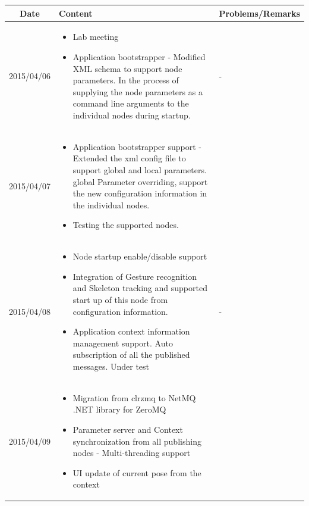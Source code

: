 \documentclass[11pt]{article} %
\begin{document}
\begin{center}
    \begin{longtable}{ | c | p{6cm} | p{5cm} |}
    \hline
    Date & Content & Problems/Remarks \\ 
    \endhead
    \hline    
     2015/04/06         & 
  \begin{itemize}
  \item Lab meeting
  \item Application bootstrapper - Modified XML schema to support node parameters. In the process of supplying the node parameters as a command line arguments to the individual nodes during startup.
\end{itemize}  
   & - \\
\hline
  										 
 2015/04/07         & 
  \begin{itemize}
  \item Application bootstrapper support - Extended the xml config file to support global and local parameters. global Parameter overriding, support the new configuration information in the individual nodes. 
  \item Testing the supported nodes. 
\end{itemize}   
& 
 \\
\hline
  										 
  
  2015/04/08        & 
  \begin{itemize}
  \item Node startup enable/disable support
  \item Integration of Gesture recognition and Skeleton tracking and supported start up of this node from configuration information.
  \item Application context information management support. Auto subscription of all the published messages. Under test
  \end{itemize}   
  										 & - \\
  \hline
  
  2015/04/09         & 
  \begin{itemize}
  \item Migration from clrzmq to NetMQ .NET library for ZeroMQ
  \item Parameter server and Context synchronization from all publishing nodes - Multi-threading support
  \item UI update of current pose from the context
\end{itemize}   
  & 
\\  										 \hline


\end{longtable}
\end{center}
\end{document}
